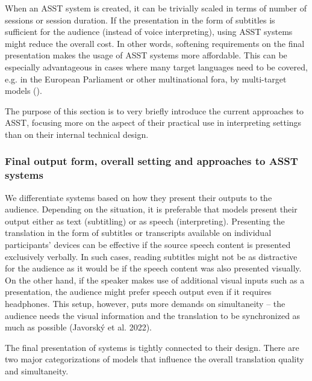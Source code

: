 \documentclass[output=paper]{langscibook}
\begin{document}
When an ASST system is created, it can be trivially scaled in terms of number of sessions or session duration. If the presentation in the form of subtitles is sufficient for the audience (instead of voice interpreting), using ASST systems might reduce the overall cost. In other words, softening requirements on the final presentation makes the usage of ASST systems more affordable. This can be especially advantageous in cases where many target languages need to be covered, e.g. in the European Parliament or other multinational fora, by multi-target models (\citealt{bojar_elitr_2021,bojar_operating_2021}).

The purpose of this section is to very briefly introduce the current approaches to ASST, focusing more on the aspect of their practical use in interpreting settings than on their internal technical design.

\subsubsection{Final output form, overall setting and approaches to ASST systems} %

We differentiate systems based on how they present their outputs to the audience. Depending on the situation, it is preferable that models present their output either as text (subtitling) or as speech (interpreting). Presenting the translation in the form of subtitles or transcripts available on individual participants’ devices \citep{bojar_elitr_2021} can be effective if the source speech content is presented exclusively verbally. In such cases, reading subtitles might not be as distractive for the audience as it would be if the speech content was also presented visually. On the other hand, if the speaker makes use of additional visual inputs such as a presentation, the audience might prefer speech output even if it requires headphones. This setup, however, puts more demands on simultaneity – the audience needs the visual information and the translation to be synchronized as much as possible (Javorský et al. 2022).

The final presentation of systems is tightly connected to their design. There are two major categorizations of models that influence the overall translation quality and simultaneity.
\end{document}
